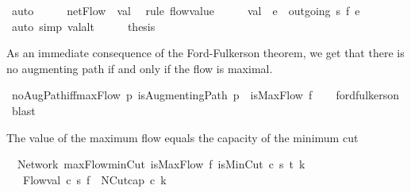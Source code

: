 \begin{isabellebody}
\ auto\isanewline
\ \ \isamarkupfalse%
\ \isamarkupfalse%
\ {\isachardoublequoteopen}netFlow\ {\isacharequal}\ val{\isachardoublequoteclose}\ \isamarkupfalse%
\ {\isacharparenleft}rule\ flow{\isacharunderscore}value{\isacharparenright}\isanewline
\ \ \isamarkupfalse%
\ \isamarkupfalse%
\ {\isachardoublequoteopen}val\ {\isacharequal}\ {\isacharparenleft}{\isasymSum}e\ {\isasymin}\ outgoing\ s{\isachardot}\ f\ e{\isacharparenright}{\isachardoublequoteclose}\ \isamarkupfalse%
\ {\isacharparenleft}auto\ simp{\isacharcolon}\ val{\isacharunderscore}alt{\isacharparenright}\isanewline
\ \ \isamarkupfalse%
\ \isamarkupfalse%
\ {\isacharquery}thesis\ \isacommand{{\isachardot}}\isamarkupfalse%
\isanewline
{}\isamarkupfalse%
%
\endisatagproof
{\isafoldproof}%
%
\isadelimproof
%
\endisadelimproof
%
\begin{isamarkuptext}%
As an immediate consequence of the Ford-Fulkerson theorem, we get that
  there is no augmenting path if and only if the flow is maximal.%
\end{isamarkuptext}\isamarkuptrue%
\isamarkupfalse%
\ noAugPath{\isacharunderscore}iff{\isacharunderscore}maxFlow{\isacharcolon}\ {\isachardoublequoteopen}{\isacharparenleft}{\isasymnexists}p{\isachardot}\ isAugmentingPath\ p{\isacharparenright}\ {\isasymlongleftrightarrow}\ isMaxFlow\ f{\isachardoublequoteclose}\isanewline
%
\isadelimproof
\ \ %
\endisadelimproof
%
\isatagproof
{}\isamarkupfalse%
\ ford{\isacharunderscore}fulkerson\ \isamarkupfalse%
\ blast%
\endisatagproof
{\isafoldproof}%
%
\isadelimproof
\isanewline
%
\endisadelimproof
\isanewline
{}\isamarkupfalse%
\ %
%
\begin{isamarkuptext}%
The value of the maximum flow equals the capacity of the minimum cut%
\end{isamarkuptext}\isamarkuptrue%
\isamarkupfalse%
\ {\isacharparenleft}\ Network{\isacharparenright}\ maxFlow{\isacharunderscore}minCut{\isacharcolon}\ {\isachardoublequoteopen}{\isasymlbrakk}isMaxFlow\ f{\isacharsemicolon}\ isMinCut\ c\ s\ t\ k{\isasymrbrakk}\ \isanewline
\ \ {\isasymLongrightarrow}\ Flow{\isachardot}val\ c\ s\ f\ {\isacharequal}\ NCut{\isachardot}cap\ c\ k{\isachardoublequoteclose}\isanewline
%
\isadelimproof
%
\endisadelimproof
%
\isatagproof
{}\isamarkupfalse%
\ {\isacharminus}\isanewline

\end{isabellebody}
